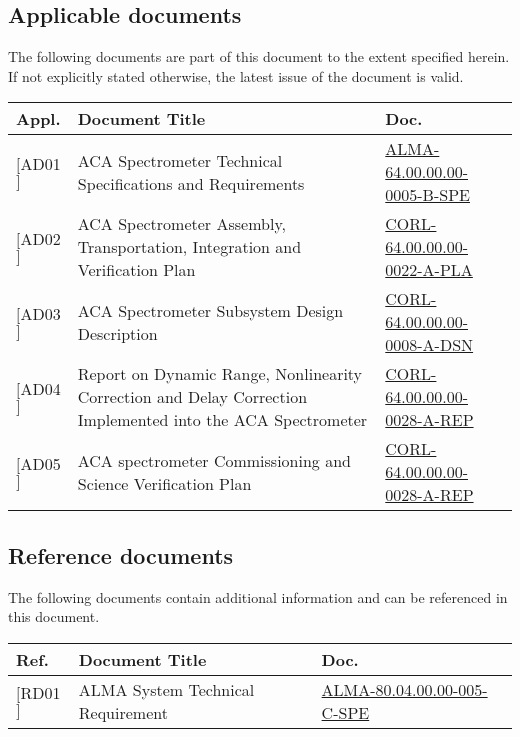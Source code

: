 \subsection{Applicable documents}
The following documents are part of this document to the extent specified herein.
If not explicitly stated otherwise, the latest issue of the document is valid.\\
\begin{tabular}{|p{1.2cm} | p{8.5cm} | p{4.5cm}|}
\hline
\rowcolor{gray} \bf Appl. & \bf Document Title &\bf Doc.\\
\hline
$[$AD01$]$ &ACA Spectrometer Technical Specifications and Requirements   					& \href{http://edm.alma.cl/forums/alma/dispatch.cgi/iptdocscorr/showFile/101189/d20210529211811/Yes/2021-04-09-ALMA-64.00.00.00-005-C-SPE-ACA_Spectrometer+Technical+Specifications.pdf}{ALMA-64.00.00.00-0005-B-SPE} \\
$[$AD02$]$ &ACA Spectrometer Assembly, Transportation, Integration and Verification Plan  	& \href{http://edm.alma.cl/forums/alma/dispatch.cgi/iptdocscorr/docProfile/101235/d20191209084810}{CORL-64.00.00.00-0022-A-PLA} \\
$[$AD03$]$ &ACA Spectrometer Subsystem Design Description   								& \href{http://edm.alma.cl/forums/alma/dispatch.cgi/iptdocscorr/docProfile/101230/d20200610070519}{CORL-64.00.00.00-0008-A-DSN} \\
$[$AD04$]$ &Report on Dynamic Range, Nonlinearity Correction and Delay Correction Implemented into the ACA Spectrometer  & \href{http://edm.alma.cl/forums/alma/dispatch.cgi/iptdocscorr/docProfile/101273/d20200825044738/No}{CORL-64.00.00.00-0028-A-REP} \\
$[$AD05$]$ &ACA spectrometer Commissioning and Science Verification Plan  & \href{http://edm.alma.cl/forums/alma/dispatch.cgi/iptdocscorr/docProfile/101273/d20200825044738/No}{CORL-64.00.00.00-0028-A-REP} \\
\hline
\end{tabular}

\subsection{Reference documents}
The following documents contain additional information and can be referenced in this document.\\
\begin{tabular}{|p{1.2cm} | p{8.5cm} | p{4.5cm}|}
\hline
\rowcolor{gray} \bf Ref. & \bf Document Title &\bf Doc.\\
\hline
$[$RD01$]$ & ALMA System Technical Requirement &  \href{}{ALMA-80.04.00.00-005-C-SPE} \\
\hline
\end{tabular}


\clearpage
